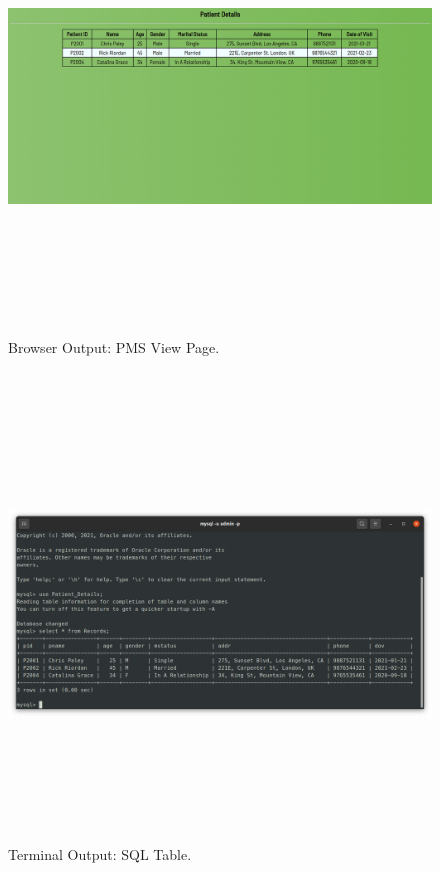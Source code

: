 \documentclass[12pt, a4]{article}
\begin{document}
\newpage
\subsection*{}
\begin{figure}[h]
\centering
\caption{Browser Output: PMS View Page.}
\includegraphics[height=12cm, width=16cm]{Output/PMSView4.png}
\end{figure}

\newpage
\subsection*{}
\begin{figure}[h]
\centering
\caption{Terminal Output: SQL Table.}
\includegraphics[height=12cm, width=18cm]{Output/SQLTable.png}
\end{figure}
\end{document}
